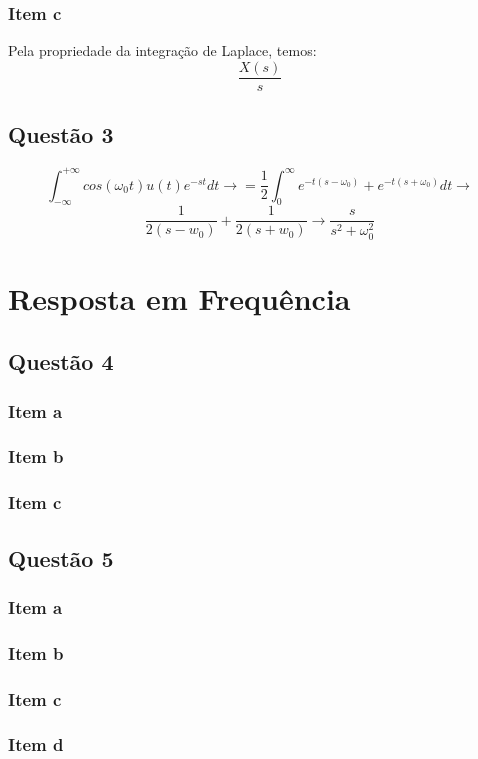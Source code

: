 \documentclass[a4paper, 12pt]{article}
\begin{document}
        \subsubsection{Item c}
        Pela propriedade da integração de Laplace, temos:
        \[\frac{X(s)}{s}\]
    \subsection{Quest\~{a}o 3}
    \[\int_{-\infty}^{+\infty} cos(\omega_{0}t)u(t)e^{-st}dt \rightarrow = \frac{1}{2}\int_{0}^{\infty} e^{-t(s-\omega _{0})} + e^{-t(s+\omega _{0})}dt \rightarrow \]
    \[\frac{1}{2(s-w_{0})} + \frac{1}{2(s+w_{0})} \rightarrow \frac{s}{s^{2} + \omega _{0}^{2} } \]
\section{Resposta em Frequ\^{e}ncia}
    \subsection{Quest\~{a}o 4}
        \subsubsection{Item a}
        \subsubsection{Item b}
        \subsubsection{Item c}
    \subsection{Quest\~{a}o 5}
        \subsubsection{Item a}
        \subsubsection{Item b}
        \subsubsection{Item c}
        \subsubsection{Item d}
\end{document}
